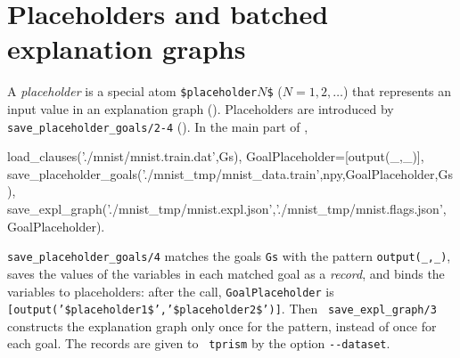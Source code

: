 \documentclass[a4paper]{report}
\begin{document}
\section{Placeholders and batched explanation graphs}
\label{sec:placeholder}

A {\em placeholder} is a special atom {\tt \$placeholder$N$\$} ($N=1,2,\ldots$)
that represents an input value in an explanation graph
().  Placeholders are introduced by {\tt
	save\_placeholder\_goals/2-4} ().  In
the main part of ,
\begin{prologcode}
    load_clauses('./mnist/mnist.train.dat',Gs),   %
    GoalPlaceholder=[output(_,_)],
    save_placeholder_goals('./mnist_tmp/mnist_data.train',npy,GoalPlaceholder,Gs),
    save_expl_graph('./mnist_tmp/mnist.expl.json','./mnist_tmp/mnist.flags.json',
                    GoalPlaceholder).
\end{prologcode}
{\tt save\_placeholder\_goals/4} matches the goals {\tt Gs} with the
pattern {\tt output(\_,\_)}, saves the values of the variables in each
matched goal as a {\em record}, and binds the variables to placeholders:
after the call, {\tt GoalPlaceholder} is {\tt
	[output('\$placeholder1\$','\$placeholder2\$')]}.  Then {\tt
	save\_expl\_graph/3} constructs the explanation graph only once for the
pattern, instead of once for each goal.  The records are given to {\tt
	tprism} by the option {\tt -{}-dataset}.
\end{document}
